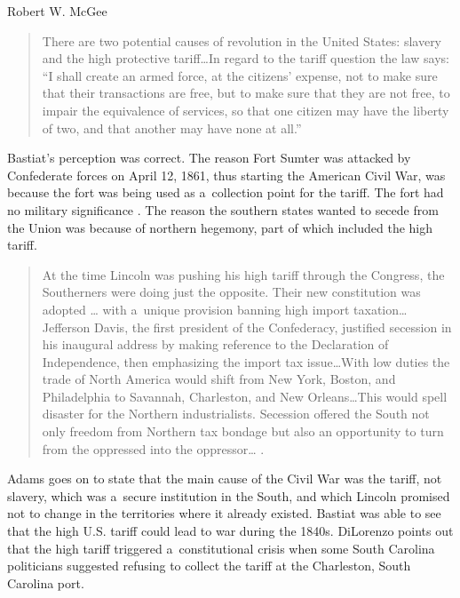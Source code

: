 \begin{artengenv}{Robert W. McGee}
\begin{quote}
There are two potential causes of revolution in the United States: slavery and the high protective tariff…In regard to the tariff question the law says: ``I shall create an armed force, at the citizens' expense, not to make sure that their transactions are free, but to make sure that they are not free, to impair the equivalence of services, so that one citizen may have the liberty of two, and that another may have none at all.'' 
\parencite[][p.462]{bastiat_economic_1964-1}%
\end{quote}




Bastiat's perception was correct. The reason Fort Sumter was attacked by Confederate forces on April 12, 1861, thus starting the American Civil War, was because the fort was being used as a~collection point for the tariff. The fort had no military significance 
\parencite[][pp.17–33]{adams_when_2000}. %
 The reason the southern states wanted to secede from the Union was because of northern hegemony, part of which included the high tariff.



\begin{quote}
At the time Lincoln was pushing his high tariff through the Congress, the Southerners were doing just the opposite. Their new constitution was adopted … with a~unique provision banning high import taxation… Jefferson Davis, the first president of the Confederacy, justified secession in his inaugural address by making reference to the Declaration of Independence, then emphasizing the import tax issue…With low duties the trade of North America would shift from New York, Boston, and Philadelphia to Savannah, Charleston, and New Orleans…This would spell disaster for the Northern industrialists. Secession offered the South not only freedom from Northern tax bondage but also an opportunity to turn from the oppressed into the oppressor… 
\parencite[][p.332]{adams_for_1993}.%
\end{quote}




Adams 
\parencite[][pp.332–333]{adams_for_1993} %
 goes on to state that the main cause of the Civil War was the tariff, not slavery, which was a~secure institution in the South, and which Lincoln promised not to change in the territories where it already existed. Bastiat 
\parencite*[][p.462]{bastiat_economic_1964-1} %
 was able to see that the high U.S. tariff could lead to war during the 1840s. DiLorenzo 
\parencite*[][p.63]{dilorenzo_real_2002} %
 points out that the high tariff triggered a~constitutional crisis when some South Carolina politicians suggested refusing to collect the tariff at the Charleston, South Carolina port.




\end{artengenv}

